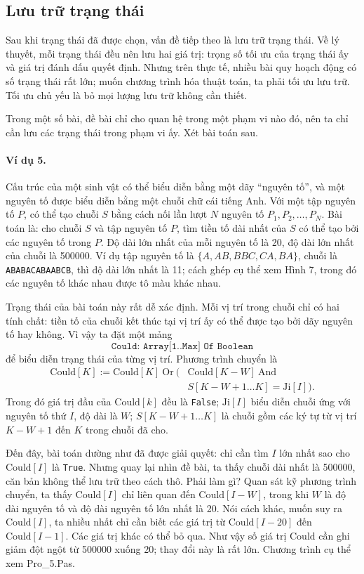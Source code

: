 \documentclass[11pt]{article}
\begin{document}
\subsection{Lưu trữ trạng thái}

Sau khi trạng thái đã được chọn, vấn đề tiếp theo là lưu trữ trạng thái. Về
lý thuyết, mỗi trạng thái đều nên lưu hai giá trị: trọng số tối ưu của trạng
thái ấy và giá trị đánh dấu quyết định. Nhưng trên thực tế, nhiều bài quy
hoạch động có số trạng thái rất lớn; muốn chương trình hóa thuật toán, ta
phải tối ưu lưu trữ. Tối ưu chủ yếu là bỏ mọi lượng lưu trữ không cần thiết.

Trong một số bài, đề bài chỉ cho quan hệ trong một phạm vi nào đó, nên ta chỉ
cần lưu các trạng thái trong phạm vi ấy. Xét bài toán sau.

\paragraph{Ví dụ 5.}
Cấu trúc của một sinh vật có thể biểu diễn bằng một dãy ``nguyên tố'', và một
nguyên tố được biểu diễn bằng một chuỗi chữ cái tiếng Anh. Với một tập nguyên
tố \(P\), có thể tạo chuỗi \(S\) bằng cách nối lần lượt \(N\) nguyên tố
\(P_1,P_2,\ldots,P_N\). Bài toán là: cho chuỗi \(S\) và tập nguyên tố \(P\),
tìm tiền tố dài nhất của \(S\) có thể tạo bởi các nguyên tố trong \(P\). Độ
dài lớn nhất của mỗi nguyên tố là 20, độ dài lớn nhất của chuỗi là 500000. Ví
dụ tập nguyên tố là
\(\{A,AB,BBC,CA,BA\}\), chuỗi là \texttt{ABABACABAABCB}, thì độ dài lớn nhất
là 11; cách ghép cụ thể xem Hình 7, trong đó các nguyên tố khác nhau được tô
màu khác nhau.

Trạng thái của bài toán này rất dễ xác định. Mỗi vị trí trong chuỗi chỉ có
hai tính chất: tiền tố của chuỗi kết thúc tại vị trí ấy có thể được tạo bởi
dãy nguyên tố hay không. Vì vậy ta đặt một mảng
\[
  \texttt{Could: Array[1..Max] Of Boolean}
\]
để biểu diễn trạng thái của từng vị trí. Phương trình chuyển là
\[
\begin{split}
  \mathrm{Could}[K] := \mathrm{Could}[K]\ \mathrm{Or}\ (&
  \mathrm{Could}[K-W]\ \mathrm{And}\\
  &S[K-W+1\ldots K]=\mathrm{Ji}[I]).
\end{split}
\]
Trong đó giá trị đầu của \(\mathrm{Could}[k]\) đều là \texttt{False};
\(\mathrm{Ji}[I]\) biểu diễn chuỗi ứng với nguyên tố thứ \(I\), độ dài là
\(W\); \(S[K-W+1\ldots K]\) là chuỗi gồm các ký tự từ vị trí \(K-W+1\) đến
\(K\) trong chuỗi đã cho.

Đến đây, bài toán dường như đã được giải quyết: chỉ cần tìm \(I\) lớn nhất
sao cho \(\mathrm{Could}[I]\) là \texttt{True}. Nhưng quay lại nhìn đề bài, ta
thấy chuỗi dài nhất là 500000, căn bản không thể lưu trữ theo cách thô. Phải
làm gì? Quan sát kỹ phương trình chuyển, ta thấy \(\mathrm{Could}[I]\) chỉ
liên quan đến \(\mathrm{Could}[I-W]\), trong khi \(W\) là độ dài nguyên tố và
độ dài nguyên tố lớn nhất là 20. Nói cách khác, muốn suy ra
\(\mathrm{Could}[I]\), ta nhiều nhất chỉ cần biết các giá trị từ
\(\mathrm{Could}[I-20]\) đến \(\mathrm{Could}[I-1]\). Các giá trị khác có thể
bỏ qua. Như vậy số giá trị \(\mathrm{Could}\) cần ghi giảm đột ngột từ 500000
xuống 20; thay đổi này là rất lớn. Chương trình cụ thể xem Pro\_5.Pas.
\end{document}
